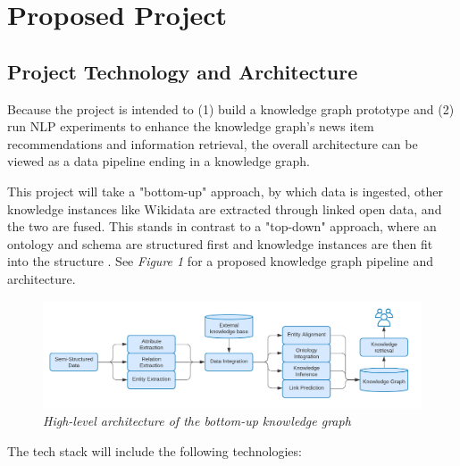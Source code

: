 \documentclass[11pt]{article}
\begin{document}
\newpage
\section{Proposed Project}
\subsection{Project Technology and Architecture}
Because the project is intended to (1) build a knowledge graph prototype and (2) run NLP experiments to enhance the knowledge graph's news item recommendations and information retrieval, the overall architecture can be viewed as a data pipeline ending in a knowledge graph.

This project will take a "bottom-up" approach, by which data is ingested, other knowledge instances like Wikidata are extracted through linked open data, and the two are fused. This stands in contrast to a "top-down" approach, where an ontology and schema are structured first and knowledge instances are then fit into the structure \cite{zhao2018architecture}. See \textit{Figure 1} for a proposed knowledge graph pipeline and architecture.

\begin{figure}
\centerline{\includegraphics[scale=0.275]{bottom-up-kg-architecture}}
\caption{\textit{High-level architecture of the bottom-up knowledge graph}}
\label{figure:BottomUpKGArchitecture}
\end{figure}

The tech stack will include the following technologies:
\end{document}
